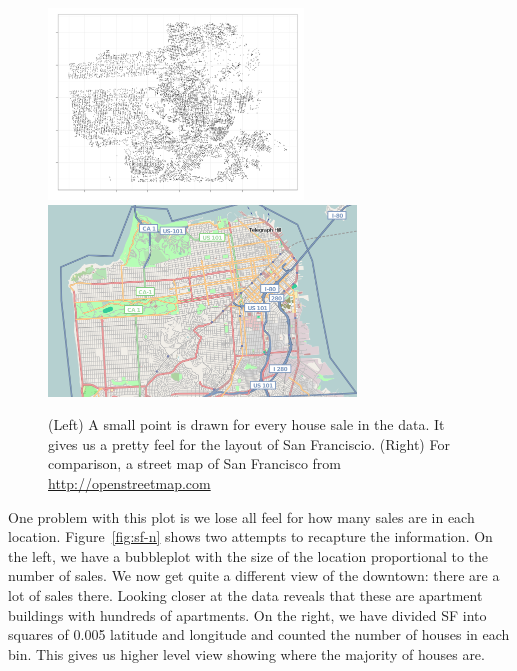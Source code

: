 \documentclass[oneside]{article}
\begin{document}
\begin{figure}[htbp]
  \centering
  \includegraphics[height=2in]{sf-geo}%
  \includegraphics[height=2in]{sf-map}
  \caption{(Left) A small point is drawn for every house sale in the data.  It gives us a pretty feel for the layout of San Franciscio. (Right) For comparison, a street map of San Francisco from \url{http://openstreetmap.com}}
  \label{fig:sf-geo}
\end{figure}

One problem with this plot is we lose all feel for how many sales are in each location. Figure~\ref{fig:sf-n} shows two attempts to recapture the information. On the left, we have a bubbleplot with the size of the location proportional to the number of sales. We now get quite a different view of the downtown: there are a lot of sales there. Looking closer at the data reveals that these are apartment buildings with hundreds of apartments. On the right, we have divided SF into squares of 0.005 latitude and longitude and counted the number of houses in each bin. This gives us higher level view showing where the majority of houses are.
\end{document}

